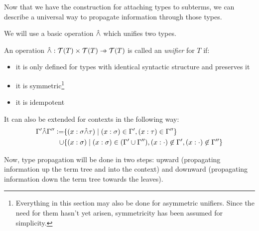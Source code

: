 \documentclass[main.tex]{subfiles}
\begin{document}
Now that we have the construction for attaching types to subterms, we can
describe a universal way to propagate information through those types.

We will use a basic operation $\hat{\wedge}$ which unifies two types.

\begin{defn}
An operation $ \unify : \tclos{T} \times \tclos{T} \pfun \tclos{T}$ is
called an \emph{unifier} for $T$ if:
\begin{itemize}
    \item it is only defined for types with identical syntactic structure and
        preserves it
    \item it is symmetric\footnote{
            Everything in this section may also be done for asymmetric unifiers.
            Since the need for them hasn't yet arisen, symmetricity has been
            assumed for simplicity.
        }
    \item it is idempotent
\end{itemize}
\end{defn}


It can also be extended for contexts in the following way:
\[
    \begin{split}
        \Gamma' \hat{\wedge} \Gamma'' \vcentcolon=
        &\{ (x : \sigma \hat{\wedge} \tau) \mid (x : \sigma) \in \Gamma', (x : \tau) \in \Gamma''\} \\
        \cup &
        \{ (x : \sigma) \mid (x : \sigma) \in (\Gamma' \cup \Gamma''),
            (x : \cdot) \not\in \Gamma',
            (x : \cdot) \not\in \Gamma'' \} \\
    \end{split}
\]

Now, type propagation will be done in two steps: upward (propagating
information up the term tree and into the context) and downward (propagating
information down the term tree towards the leaves).
\end{document}
